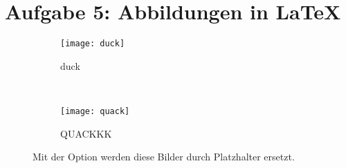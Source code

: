 \newpage
\section{Aufgabe 5: Abbildungen in \LaTeX}
\begin{figure}[h]
\centering
    \begin{subfigure}[h]{.4\textwidth}
        \texttt{[image: duck]}
        \caption{duck}
        \label{fig:duck}
    \end{subfigure}
    ~
    \begin{subfigure}[h]{.4\textwidth}
        \texttt{[image: quack]}
        \caption{QUACKKK}
        \label{fig:quack}
    \end{subfigure}
    \caption{Mit der Option  werden diese Bilder durch Platzhalter ersetzt.}
    \label{fig:fig1}
\end{figure}
